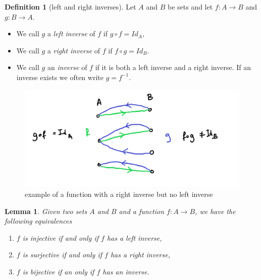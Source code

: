 \documentclass[
]{book}
\newtheorem{lemma}{Lemma}[chapter]
\theoremstyle{definition}
\newtheorem{definition}{Definition}[chapter]
\theoremstyle{definition}
\theoremstyle{definition}
\theoremstyle{definition}
\theoremstyle{remark}
\begin{document}
\begin{definition}[left and right inverses]

Let \(A\) and \(B\) be sets and let \(f: A \rightarrow B\) and \(g: B \rightarrow A\).

\begin{itemize}
\item
  We call \(g\) a \emph{left inverse} of \(f\) if \(g\circ f = Id_A\),
\item
  We call \(g\) a \emph{right inverse} of \(f\) if \(f\circ g = Id_B\).
\item
  We call \(g\) an \emph{inverse} of \(f\) if it is both a left inverse and a right inverse. If an inverse exists we often write \(g = f^{-1}\).
\end{itemize}

\end{definition}

\begin{figure}
\centering
\includegraphics{leftrightinverse.png}
\caption{\label{fig:unnamed-chunk-20}example of a function with a right inverse but no left inverse}
\end{figure}

\begin{lemma}

Given two sets \(A\) and \(B\) and a function \(f: A \rightarrow B\), we have the following equivalences

\begin{enumerate}
\def\labelenumi{\arabic{enumi}.}
\item
  \(f\) is injective if and only if \(f\) has a left inverse,
\item
  \(f\) is surjective if and only if \(f\) has a right inverse,
\item
  \(f\) is bijective if an only if \(f\) has an inverse.
\end{enumerate}

\end{lemma}
\end{document}
